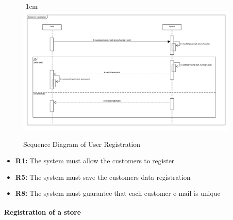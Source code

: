 \documentclass{article}
\begin{document}
\begin{center}
\begin{adjustwidth}{-2.8cm}{}
					
					

					\begin{figure}[!h]
						\begin{adjustwidth} {-1cm}{}
							\includegraphics[scale=0.36]{SD/1_customerRegistration.pdf}
						\end{adjustwidth}
						\caption{Sequence Diagram of User Registration}
					\end{figure}

					

					\end{adjustwidth}
					\begin{itemize}
					\medskip
					 {\bfseries Required functional requirements: }
					\item {\bfseries R1: } The system must allow the customers to register
					\item {\bfseries R5: } The system must save the customers data registration
					\item {\bfseries R8: } The system must guarantee that each customer e-mail is unique	

					\end{itemize}
				\end{center}
		\bigskip
			\paragraph{Registration of a store}
			
\end{document}
